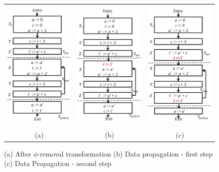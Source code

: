 \begin{figure}[t!]
\begin{center}
\begin{tabular}{ccc}
\includegraphics[height=2.5in]{fig-proposal/algorithm-after-phi-removal}
&
\includegraphics[height=2.5in]{fig-proposal/algorithm-after-data-propagation-1}
&
\includegraphics[height=2.5in]{fig-proposal/algorithm-after-data-propagation-2}
\\
(a) & (b) & (c)
\end{tabular}
\end{center}
\caption{(a) After $\phi$-removal transformation (b) Data propagation - first step (c) Data Propagation - second step}
\label{fig:algo2}
\end{figure}

